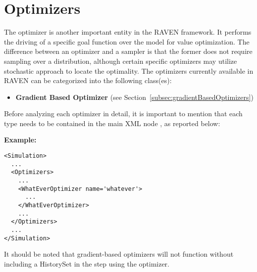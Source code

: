 \section{Optimizers}
\label{sec:Optimizers}

\renewcommand{\nameDescription}
{
  \xmlAttr{name},
  \xmlDesc{required string attribute}, user-defined name of this optimizer.
  \nb As with other objects, this identifier can be used to reference this
  specific entity from other input blocks in the XML.
}
\renewcommand{\specBlock}[2]
{
  The specifications of this optimizer must be defined within #1 \xmlNode{#2} XML
  block.
}



The optimizer is another important entity in the RAVEN framework. It performs the driving of a specific goal function
over the model for value optimization. The difference between an optimizer and a sampler is that the former does not require
 sampling over a distribution, although certain specific optimizers may utilize stochastic approach to locate the optimality.
The optimizers currently available in RAVEN can be categorized into the following class(es):
\begin{itemize}
\item \textbf{Gradient Based Optimizer} (see Section~\ref{subsec:gradientBasedOptimizers})
\end{itemize}

Before analyzing each optimizer in detail, it is important to mention that each type needs to be contained in the main XML
node , as reported below:

\textbf{Example:}

\begin{lstlisting}[style=XML]
<Simulation>
  ...
  <Optimizers>
    ...
    <WhatEverOptimizer name='whatever'>
      ...
    </WhatEverOptimizer>
    ...
  </Optimizers>
  ...
</Simulation>
\end{lstlisting}

It should be noted that gradient-based optimizers will not function without including a
 HistorySet in the  step using the optimizer.

